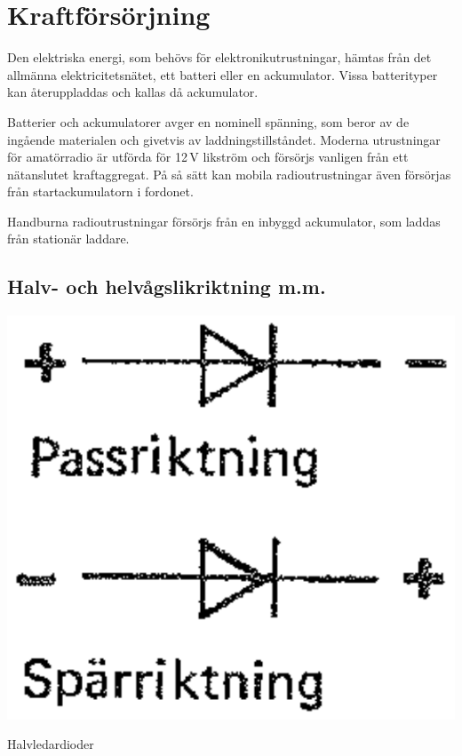 \section{Kraftförsörjning}
\label{kraftaggregat}


Den elektriska energi, som behövs för elektronikutrustningar, hämtas
från det allmänna elektricitetsnätet, ett batteri eller en
ackumulator.
Vissa batterityper kan återuppladdas och kallas då ackumulator.

Batterier och ackumulatorer avger en nominell spänning, som beror av
de ingående materialen och givetvis av laddningstillståndet.
Moderna utrustningar för amatörradio är utförda för 12\,V likström och försörjs
vanligen från ett nätanslutet kraftaggregat.
På så sätt kan mobila radioutrustningar även försörjas från startackumulatorn
i fordonet.

Handburna radioutrustningar försörjs från en inbyggd ackumulator, som
laddas från stationär laddare.


\subsection{Halv- och helvågslikriktning m.m.}

\begin{marginfigure}
  \includegraphics[width=.5\textwidth]{images/cropped_pdfs/bild_2_3-34.pdf}
  \caption{Halvledardioder}
  \label{fig:BildII3-34}
\end{marginfigure}

